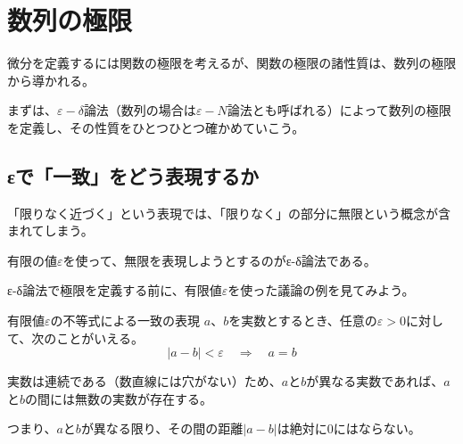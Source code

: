 \documentclass[../../math-imaging]{subfiles}
\begin{document}
\section{数列の極限}

微分を定義するには関数の極限を考えるが、関数の極限の諸性質は、数列の極限から導かれる。

まずは、$\varepsilon - \delta $論法（数列の場合は$\varepsilon - N$論法とも呼ばれる）によって数列の極限を定義し、その性質をひとつひとつ確かめていこう。

\subsection{εで「一致」をどう表現するか}

「限りなく近づく」という表現では、「限りなく」の部分に無限という概念が含まれてしまう。

有限の値$\varepsilon$を使って、無限を表現しようとするのがε-δ論法である。

\froufrou

ε-δ論法で極限を定義する前に、有限値$\varepsilon$を使った議論の例を見てみよう。

\begin{theorem}{有限値$\varepsilon $の不等式による一致の表現}\label{theorem:有限値εの不等式による一致の表現}
  \newline
  $a$、$b$を実数とするとき、任意の$\varepsilon >0$に対して、次のことがいえる。
  \LARGE
  \begin{equation}
    |a-b|<\varepsilon \quad \Longrightarrow  \quad a=b
  \end{equation}
\end{theorem}

実数は連続である（数直線には穴がない）ため、$a$と$b$が異なる実数であれば、$a$と$b$の間には無数の実数が存在する。

つまり、$a$と$b$が異なる限り、その間の距離$|a-b|$は絶対に$0$にはならない。
\end{document}
